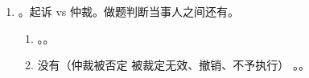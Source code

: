 \begin{enumerate}
\begin{enumerate}
                \begin{enumerate}
                  \item 制作调解书 \hz 裁决书。
                  \item 不要和诉讼调解混。。
                \end{enumerate}
          \item 裁决。边裁 1 票，首裁 1.5 票。作出之日生效。。
                \begin{enumerate}
                  \item 在作出裁决前，可以先行调解。
                  \item 少数服从多数原则。无法形成多数意见（3 人 3 意见） \yjt 首裁。
                  \item 推得。1 个签名 \yjt 首席。2 个 \yjt 多数意见。3 个 \yjt 都同意。
                \end{enumerate}
          \item 裁决书。
                \begin{enumerate}
                  \item 内容。应当写明请求、争议事实、裁决理由（经同意可忽略）、结果、费用负担、裁决的时间和地点。
                  \item 签名。持不同意见的可以拒绝签名 \yjt 签名即担责（署名不用）。无声的反抗。
                \end{enumerate}
        \end{enumerate}
  \item {}。起诉 vs 仲裁。做题判断当事人之间还有。
        \begin{enumerate}
          \item {}。。
          \item 没有（仲裁被否定 \yjt 被裁定无效、撤销、不予执行） \yjt \yi {}。\er {}。
        \end{enumerate}
\end{enumerate}
